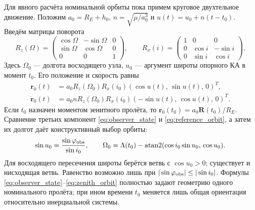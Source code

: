\documentclass[a4paper,12pt]{article}
\begin{document}
Для явного расчёта номинальной орбиты пока примем круговое двухтельное движение. Положим $a_0=R_E+h_0$, $n=\sqrt{\mu/a_0^3}$ и $u(t)=u_0+n(t-t_0)$. Введём матрицы поворота
\begin{equation}
 R_z(\Omega)=
 \begin{pmatrix}\cos\Omega&-\sin\Omega&0\\
                 \sin\Omega& \cos\Omega&0\\0&0&1\end{pmatrix},
 \qquad
 R_x(i)=
 \begin{pmatrix}1&0&0\\0&\cos i&-\sin i\\0&\sin i&\cos i\end{pmatrix}.
 \label{eq:rotation_matrices}
\end{equation}
Здесь $\Omega_0$ --- долгота восходящего узла, $u_0$ --- аргумент широты опорного КА в момент $t_0$. Его положение и скорость равны
\begin{equation}
\begin{aligned}
 \mathbf r_0(t)&=a_0R_z(\Omega_0)R_x(i_0)
       (\cos u(t),\,\sin u(t),\,0)^T,\\
 \dot{\mathbf r}_0(t)&=a_0nR_z(\Omega_0)R_x(i_0)
       (-\sin u(t),\,\cos u(t),\,0)^T.
\end{aligned}
\label{eq:reference_orbit}
\end{equation}
Если $t_0$ назначен моментом зенитного пролёта, то
$\mathbf r_0(t_0)=a_0\mathbf R(t_0)/R_E$. Сравнение третьих компонент
\eqref{eq:observer_state} и \eqref{eq:reference_orbit}, а затем их долгот
даёт конструктивный выбор орбиты:
\begin{equation}
 \sin u_0=\frac{\sin\varphi_{\rm obs}}{\sin i_0},\qquad
 \Omega_0=\Lambda(t_0)-
   \operatorname{atan2}(\cos i_0\sin u_0,\,\cos u_0).
 \label{eq:zenith_orbit}
\end{equation}
Для восходящего пересечения широты берётся ветвь с $\cos u_0>0$;
существует и нисходящая ветвь. Равенство возможно лишь при
$|\sin\varphi_{\rm obs}|\leq|\sin i_0|$. Формулы
\eqref{eq:observer_state}--\eqref{eq:zenith_orbit} полностью задают
геометрию одного номинального пролёта; при ином времени $t_0$ меняется
лишь общая ориентация относительно инерциальной системы.
\end{document}
